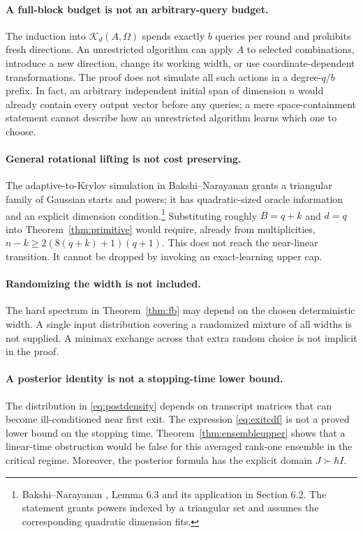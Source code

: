 \documentclass[11pt]{article}
\theoremstyle{definition}
\newcommand{\K}{\mathcal K}
\begin{document}
\paragraph{A full-block budget is not an arbitrary-query budget.}
The induction into $\K_d(A,\Omega)$ spends exactly $b$ queries per round and prohibits fresh directions. An unrestricted algorithm can apply $A$ to selected combinations, introduce a new direction, change its working width, or use coordinate-dependent transformations. The proof does not simulate all such actions in a degree-$q/b$ prefix. In fact, an arbitrary independent initial span of dimension $n$ would already contain every output vector before any queries; a mere space-containment statement cannot describe how an unrestricted algorithm learns which one to choose.

\paragraph{General rotational lifting is not cost preserving.}
The adaptive-to-Krylov simulation in Bakshi--Narayanan grants a triangular family of Gaussian starts and powers; it has quadratic-sized oracle information and an explicit dimension condition.\footnote{Bakshi--Narayanan \cite{bn}, Lemma 6.3 and its application in Section 6.2. The statement grants powers indexed by a triangular set and assumes the corresponding quadratic dimension fits.} Substituting roughly $B=q+k$ and $d=q$ into Theorem~\ref{thm:primitive} would require, already from multiplicities, $n-k\ge2(8(q+k)+1)(q+1)$. This does not reach the near-linear transition. It cannot be dropped by invoking an exact-learning upper cap.

\paragraph{Randomizing the width is not included.}
The hard spectrum in Theorem~\ref{thm:fb} may depend on the chosen deterministic width. A single input distribution covering a randomized mixture of all widths is not supplied. A minimax exchange across that extra random choice is not implicit in the proof.

\paragraph{A posterior identity is not a stopping-time lower bound.}
The distribution in \eqref{eq:postdensity} depends on transcript matrices that can become ill-conditioned near first exit. The expression \eqref{eq:exitcdf} is not a proved lower bound on the stopping time. Theorem~\ref{thm:ensembleupper} shows that a linear-time obstruction would be false for this averaged rank-one ensemble in the critical regime. Moreover, the posterior formula has the explicit domain $J\succ hI$.
\end{document}
